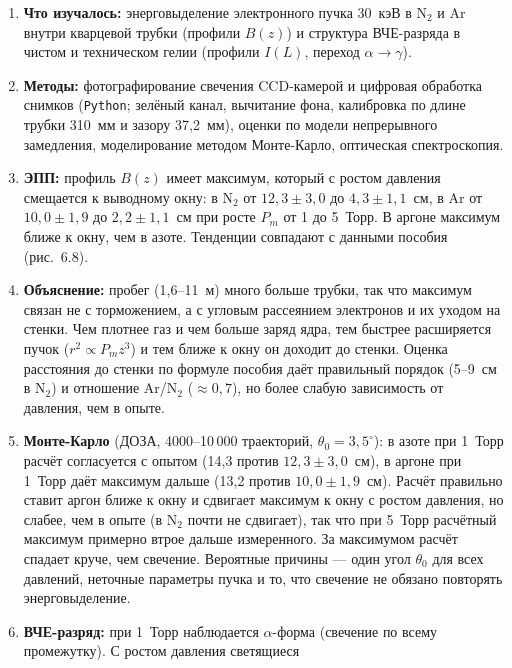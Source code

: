 \documentclass[12pt,a4paper]{article}
\newcommand{\Nt}{\mathrm{N_2}}
\begin{document}
\begin{enumerate}
  \item \textbf{Что изучалось:} энерговыделение электронного пучка
        30~кэВ в $\Nt$ и Ar внутри кварцевой трубки (профили $B(z)$) и
        структура ВЧЕ-разряда в чистом и техническом гелии (профили
        $I(L)$, переход $\alpha\to\gamma$).
  \item \textbf{Методы:} фотографирование свечения CCD-камерой и
        цифровая обработка снимков (\texttt{Python}; зелёный канал,
        вычитание фона, калибровка по длине трубки 310~мм и зазору
        37,2~мм), оценки по модели непрерывного замедления,
        моделирование методом Монте-Карло, оптическая спектроскопия.
  \item \textbf{ЭПП:} профиль $B(z)$ имеет максимум, который с ростом
        давления смещается к выводному окну: в $\Nt$ от $12{,}3\pm3{,}0$ до
        $4{,}3\pm1{,}1$~см, в Ar от $10{,}0\pm1{,}9$ до $2{,}2\pm1{,}1$~см при росте $P_m$
        от 1 до 5~Торр. В аргоне максимум ближе к окну, чем в азоте.
        Тенденции совпадают с данными пособия (рис.~6.8).
  \item \textbf{Объяснение:} пробег (1,6--11~м) много больше трубки, так
        что максимум связан не с торможением, а с угловым рассеянием
        электронов и их уходом на стенки. Чем плотнее газ и чем больше
        заряд ядра, тем быстрее расширяется пучок ($r^2\propto P_m z^3$)
        и тем ближе к окну он доходит до стенки. Оценка расстояния до
        стенки по формуле пособия даёт правильный порядок
        (5--9~см в $\Nt$) и отношение Ar/$\Nt$ ($\approx 0{,}7$), но более
        слабую зависимость от давления, чем в опыте.
  \item \textbf{Монте-Карло} (ДОЗА, 4000--10\,000 траекторий,
        $\theta_0 = 3{,}5^\circ$): в азоте при 1~Торр расчёт согласуется
        с опытом (14,3 против $12{,}3\pm3{,}0$~см), в аргоне при 1~Торр
        даёт максимум дальше (13,2 против $10{,}0\pm1{,}9$~см). Расчёт
        правильно ставит аргон ближе к окну и сдвигает максимум к окну с
        ростом давления, но слабее, чем в опыте (в $\Nt$ почти не
        сдвигает), так что при 5~Торр расчётный максимум примерно втрое
        дальше измеренного. За максимумом расчёт спадает круче, чем
        свечение. Вероятные причины --- один угол $\theta_0$ для всех
        давлений, неточные параметры пучка и то, что свечение не обязано
        повторять энерговыделение.
  \item \textbf{ВЧЕ-разряд:} при 1~Торр наблюдается $\alpha$-форма
        (свечение по всему промежутку). С ростом давления светящиеся

\end{enumerate}
\end{document}
